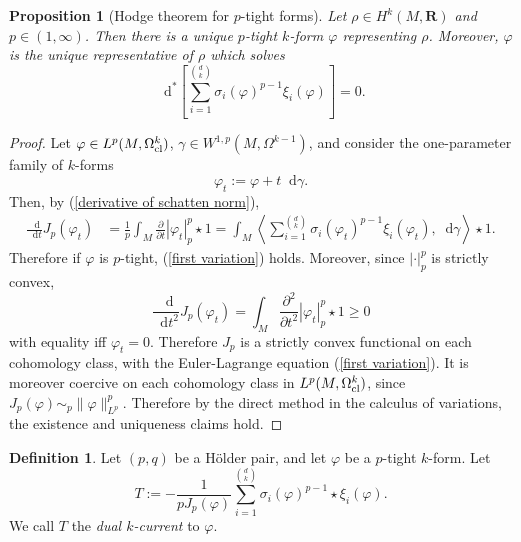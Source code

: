 \documentclass[reqno,11pt]{amsart}
\newcommand{\RR}{\mathbf{R}}
\newcommand*\dif{\mathop{}\!\mathrm{d}}
\newcommand{\dfn}[1]{\emph{#1}\index{#1}}
\newtheorem{proposition}[theorem]{Proposition}
\theoremstyle{definition}
\newtheorem{definition}[theorem]{Definition}
\numberwithin{equation}{section}
\begin{document}
\begin{proposition}[Hodge theorem for $p$-tight forms]
Let $\rho \in H^k(M, \RR)$ and $p \in (1, \infty)$.
Then there is a unique $p$-tight $k$-form $\varphi$ representing $\rho$.
Moreover, $\varphi$ is the unique representative of $\rho$ which solves
\begin{equation}\label{first variation}
\dif^*\left[\sum_{i=1}^{\binom dk} \sigma_i(\varphi)^{p - 1} \xi_i(\varphi)\right] = 0.
\end{equation}
\end{proposition}
\begin{proof}
Let $\varphi \in L^p(M, \Omega^k_{\rm cl})$, $\gamma \in W^{1, p}(M, \Omega^{k - 1})$, and consider the one-parameter family of $k$-forms
$$\varphi_t := \varphi + t \dif \gamma.$$
Then, by (\ref{derivative of schatten norm}),
\begin{align*}
\frac{\dif}{\dif t} J_p(\varphi_t)
&= \frac{1}{p} \int_M \frac{\partial}{\partial t} |\varphi_t|_p^p \star 1
= \int_M \left\langle \sum_{i=1}^{\binom dk} \sigma_i(\varphi_t)^{p - 1} \xi_i(\varphi_t), \dif \gamma\right\rangle \star 1.
\end{align*}
Therefore if $\varphi$ is $p$-tight, (\ref{first variation}) holds.
Moreover, since $|\cdot|_p^p$ is strictly convex, 
$$\frac{\dif}{\dif t^2} J_p(\varphi_t) = \int_M \frac{\partial^2}{\partial t^2} |\varphi_t|_p^p \star 1 \geq 0$$
with equality iff $\varphi_t = 0$.
Therefore $J_p$ is a strictly convex functional on each cohomology class, with the Euler-Lagrange equation (\ref{first variation}).
It is moreover coercive on each cohomology class in $L^p(M, \Omega^k_{\rm cl})$, since $J_p(\varphi) \sim_p \|\varphi\|_{L^p}^p$.
Therefore by the direct method in the calculus of variations, the existence and uniqueness claims hold.
\end{proof}

\begin{definition}
Let $(p, q)$ be a H\"older pair, and let $\varphi$ be a $p$-tight $k$-form.
Let
$$T := -\frac{1}{p J_p(\varphi)} \sum_{i=1}^{\binom dk} \sigma_i(\varphi)^{p - 1} \star \xi_i(\varphi).$$
We call $T$ the \dfn{dual $k$-current} to $\varphi$.
\end{definition}
\end{document}
